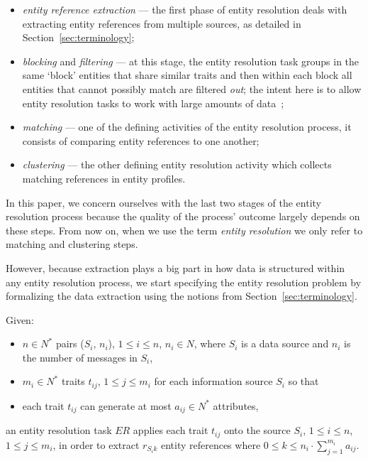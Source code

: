 \documentclass[journal]{IEEEtran}
\begin{document}
    \begin{itemize}
        \item \textit{entity reference extraction} --- the first phase of entity
        resolution deals with extracting entity references from multiple
        sources, as detailed in Section~\ref{sec:terminology};
        \item \textit{blocking} and \textit{filtering} --- at this stage, the
        entity resolution task groups in the same `block' entities that share
        similar traits and then within each block all entities that cannot
        possibly match are filtered \textit{out}; the intent here is to allow
        entity resolution tasks to work with large amounts of data~\cite{Pap19};
        \item \textit{matching} --- one of the defining activities of the entity
        resolution process, it consists of comparing entity references to one
        another;
        \item \textit{clustering} --- the other defining entity resolution
        activity which collects matching references in entity profiles.
    \end{itemize}

    In this paper, we concern ourselves with the last two stages of the entity
    resolution process because the quality of the process' outcome largely
    depends on these steps.
    From now on, when we use the term \textit{entity resolution} we only refer
    to matching and clustering steps.

    However, because extraction plays a big part in how data is structured
    within any entity resolution process, we start specifying the entity
    resolution problem by formalizing the data extraction using the notions from
    Section~\ref{sec:terminology}.
    
    Given:
    \begin{itemize}
        \item $n \in N^*$ pairs ($S_i$, $n_i$), $1 \leq i \leq n$, $n_i \in N$, 
        where $S_i$ is a data source and $n_i$ is the number of messages in
        $S_i$,
        \item $m_i \in N^*$ traits $t_{ij}$, $1 \leq j \leq m_i$ for each
        information source $S_i$ so that
        \item each trait $t_{ij}$ can generate at most $a_{ij} \in N^*$
        attributes,
    \end{itemize}
    an entity resolution task $ER$ applies each trait $t_{ij}$ onto the source
    $S_i$, $1 \leq i \leq n$, $1 \leq j \leq m_i$, in order to extract
    $r_{{S_i}k}$ entity references where
    $0 \leq k \leq n_i \cdot \sum^{m_i}_{j=1}a_{ij}$.
    
\end{document}
